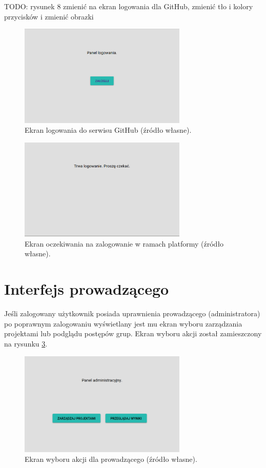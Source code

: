 TODO: rysunek 8 zmienić na ekran logowania dla GitHub, zmienić tło i kolory przycisków i zmienić obrazki
\begin{figure}[h]
    \centering
    \includegraphics[width = 8cm]{chapter04/log_in_button.png}
    \caption{Ekran logowania do serwisu GitHub (źródło własne).}
    \label{fig:log_in_butoon}
\end{figure}

\begin{figure}[H]
    \centering
    \includegraphics[width = 8cm]{chapter04/wait_for_login.png}
    \caption{Ekran oczekiwania na zalogowanie w ramach platformy (źródło własne).}
    \label{fig:wait_for_login}
\end{figure}

\section{Interfejs prowadzącego}

Jeśli zalogowany użytkownik posiada uprawnienia prowadzącego (administratora) po poprawnym zalogowaniu wyświetlany jest mu ekran wyboru zarządzania projektami lub podglądu postępów grup.
Ekran wyboru akcji został zamieszczony na rysunku \ref{fig:lecturer_actions}.

\begin{figure}[h]
    \centering
    \includegraphics[width = 8cm]{chapter04/lecturer_actions.png}
    \caption{Ekran wyboru akcji dla prowadzącego (źródło własne).}
    \label{fig:lecturer_actions}
\end{figure}

